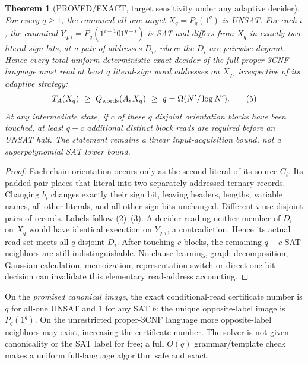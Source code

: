 \documentclass[11pt]{article}
\newtheorem{theorem}{Theorem}
\begin{document}
\begin{theorem}[PROVED/EXACT, target sensitivity under any adaptive decider]\label{th:lift}
For every $q\ge1$, the canonical all-one target
$X_q=P_q(1^q)$ is UNSAT. For each $i$, the canonical
$Y_{q,i}=P_q(1^{i-1}01^{q-i})$ is SAT and differs from $X_q$
in exactly \emph{two literal-sign bits}, at a pair of addresses
$D_i$, where the $D_i$ are pairwise disjoint. Hence every total
uniform deterministic exact decider of the \emph{full proper-3CNF
language} must read at least $q$ literal-sign word addresses on
$X_q$, irrespective of its adaptive strategy:
\[
T_A(X_q)\ \ge\ Q_{\rm words}(A,X_q)\ \ge\ q
=\Omega(N'/\log N').\tag{5}
\]
At any intermediate state, if $c$ of these $q$ disjoint
orientation blocks have been touched, at least $q-c$
additional distinct block reads are required before an UNSAT halt.
The statement remains a linear input-acquisition bound, not
a superpolynomial SAT lower bound.
\end{theorem}
\begin{proof}
Each chain orientation occurs only as the second literal of its
source $C_i$. Its padded pair places that literal into two
separately addressed ternary records. Changing $b_i$ changes
exactly their sign bit, leaving headers, lengths, variable names,
all other literals, and all other sign bits unchanged. Different
$i$ use disjoint pairs of records. Labels follow (2)--(3).
A decider reading neither member of $D_i$ on $X_q$ would have
identical execution on $Y_{q,i}$, a contradiction. Hence its actual
read-set meets all $q$ disjoint $D_i$. After touching $c$
blocks, the remaining $q-c$ SAT neighbors are still
indistinguishable. No clause-learning, graph decomposition,
Gaussian calculation, memoization, representation switch or
direct one-bit decision can invalidate this elementary
read-address accounting.
\end{proof}
\noindent On the \emph{promised canonical image}, the exact
conditional-read certificate number is $q$ for all-one UNSAT
and $1$ for any SAT $b$: the unique opposite-label image is
$P_q(1^q)$. On the unrestricted proper-3CNF language more
opposite-label neighbors may exist, increasing the certificate
number. The solver is not given canonicality or the SAT label
for free; a full $O(q)$ grammar/template check makes a uniform
full-language algorithm safe and exact.
\end{document}
